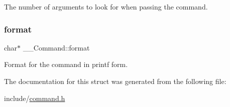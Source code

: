 The number of arguments to look for when passing the command. 

\mbox{\label{struct_____command_a1c0253e6cfc982c6bb80dae3fddb5162}} 
\subsubsection{\texorpdfstring{format}{format}}
{\footnotesize\ttfamily char$\ast$ \+\_\+\+\_\+\+Command\+::format}



Format for the command in printf form. 



The documentation for this struct was generated from the following file\+:\begin{DoxyCompactItemize}
\item 
include/\mbox{\hyperlink{command_8h}{command.\+h}}\end{DoxyCompactItemize}
